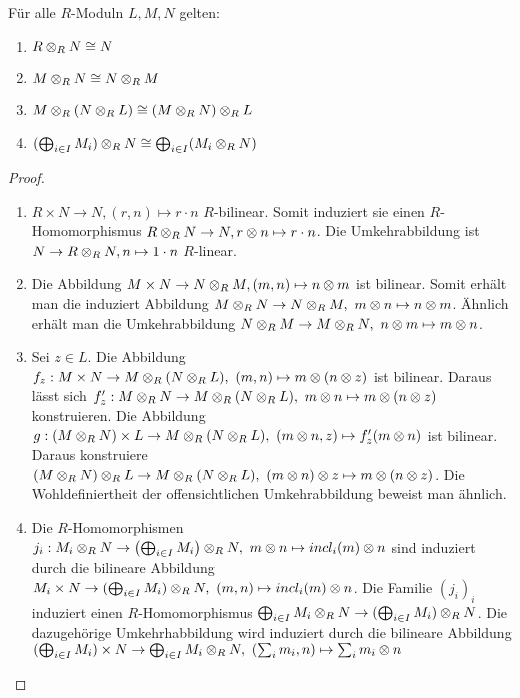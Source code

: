 \documentclass[../main.tex]{subfiles}
\begin{document}
\begin{lemma}
    Für alle $R$-Moduln $L,M,N$ gelten:
    \begin{enumerate}[label=(\roman*)]
        \item $R\otimes_R N \cong N$
        \item $M\otimes_R N \cong N\otimes_R M$
        \item $M\otimes_R (N\otimes_R L) \cong (M\otimes_R N)\otimes_R L$
        \item $(\bigoplus_{i\in I} M_i)\otimes_R N \cong \bigoplus_{i\in I} (M_i\otimes_R N)$
    \end{enumerate}
\end{lemma}

\begin{proof}$ $
    \begin{enumerate}[label=(\roman*)]
        \item
        $R\times N \rightarrow N, (r,n)\mapsto r\cdot n$ $R$-bilinear.
        Somit induziert sie einen $R$-Homomorphismus $R\otimes_R N\rightarrow N, r\otimes n\mapsto r\cdot n$.
        Die Umkehrabbildung ist $N\rightarrow R\otimes_R N, n\mapsto 1\cdot n$ $R$-linear.
        \item 
        Die Abbildung $M\times N\rightarrow N\otimes_R M, (m,n)\mapsto n\otimes m$ ist bilinear. Somit erhält man die induziert Abbildung $M\otimes_R N \rightarrow N\otimes_R M,\ m\otimes n\mapsto n\otimes m$.
        Ähnlich erhält man die Umkehrabbildung $N\otimes_R M \rightarrow M\otimes_R N,\ n\otimes m \mapsto m\otimes n$.
        \item 
        Sei $z\in L$. Die Abbildung $f_z:M\times N\rightarrow M\otimes_R(N\otimes_R L),\ (m,n) \mapsto m\otimes (n\otimes z)$ ist bilinear.
        Daraus lässt sich $f'_z:M\otimes_R N \rightarrow M \otimes_R(N\otimes_R L),\ m\otimes n\mapsto m\otimes(n\otimes z)$ konstruieren.
        Die Abbildung $g:(M\otimes_R N)\times L \rightarrow M \otimes_R ( N\otimes_R L),\ (m\otimes n,z) \mapsto f'_z (m\otimes n)$ ist bilinear.
        Daraus konstruiere $(M\otimes_R N)\otimes_R L \rightarrow M \otimes_R (N\otimes_R L),\ (m\otimes n)\otimes z \mapsto m\otimes (n\otimes z)$.
        Die Wohldefiniertheit der offensichtlichen Umkehrabbildung beweist man ähnlich.
        \item 
        Die $R$-Homomorphismen $j_i:M_i\otimes_R N \rightarrow\left(\bigoplus_{i\in I} M_i\right) \otimes_R N,\ m\otimes n\mapsto incl_i(m)\otimes n$ sind induziert durch die bilineare Abbildung $M_i\times N \rightarrow (\bigoplus_{i\in I} M_i) \otimes_R N,\ (m,n) \mapsto incl_i(m) \otimes n$.
        Die Familie $(j_i)_i$ induziert einen $R$-Homomorphismus $\bigoplus_{i\in I} M_i\otimes_R N \rightarrow (\bigoplus_{i\in I} M_i) \otimes_R N$.
        Die dazugehörige Umkehrhabbildung wird induziert durch die bilineare Abbildung $(\bigoplus_{i\in I} M_i) \times N \rightarrow \bigoplus_{i\in I} M_i \otimes_R N,\ (\sum_i m_i,n)\mapsto \sum_i m_i\otimes n$ 
        
    \end{enumerate}
\end{proof}
\end{document}
